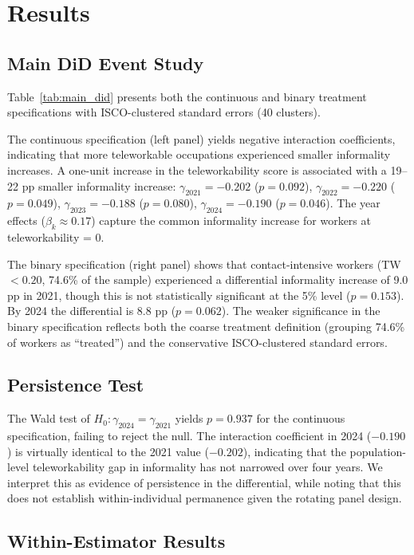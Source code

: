 \section{Results}
\label{sec:results}

\subsection{Main DiD Event Study}

Table~\ref{tab:main_did} presents both the continuous and binary treatment specifications with ISCO-clustered standard errors (40 clusters).

The continuous specification (left panel) yields negative interaction coefficients, indicating that more teleworkable occupations experienced smaller informality increases. A one-unit increase in the teleworkability score is associated with a 19--22 pp smaller informality increase: $\gamma_{2021} = -0.202$ ($p = 0.092$), $\gamma_{2022} = -0.220$ ($p = 0.049$), $\gamma_{2023} = -0.188$ ($p = 0.080$), $\gamma_{2024} = -0.190$ ($p = 0.046$). The year effects ($\beta_k \approx 0.17$) capture the common informality increase for workers at teleworkability = 0.

The binary specification (right panel) shows that contact-intensive workers (TW $< 0.20$, 74.6\% of the sample) experienced a differential informality increase of 9.0 pp in 2021, though this is not statistically significant at the 5\% level ($p = 0.153$). By 2024 the differential is 8.8 pp ($p = 0.062$). The weaker significance in the binary specification reflects both the coarse treatment definition (grouping 74.6\% of workers as ``treated'') and the conservative ISCO-clustered standard errors.

\subsection{Persistence Test}

The Wald test of $H_0: \gamma_{2024} = \gamma_{2021}$ yields $p = 0.937$ for the continuous specification, failing to reject the null. The interaction coefficient in 2024 ($-0.190$) is virtually identical to the 2021 value ($-0.202$), indicating that the population-level teleworkability gap in informality has not narrowed over four years. We interpret this as evidence of persistence in the differential, while noting that this does not establish within-individual permanence given the rotating panel design.

\subsection{Within-Estimator Results}


